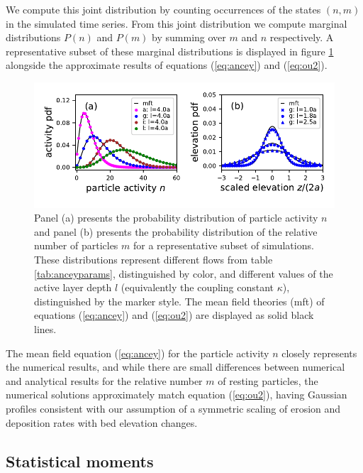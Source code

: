 \documentclass[draft]{agujournal2018}
\begin{document}
We compute this joint distribution by counting occurrences of the states $(n,m)$ in the simulated time series.
From this joint distribution we compute marginal distributions $P(n)$ and $P(m)$ by summing over $m$ and $n$ respectively.
A representative subset of these marginal distributions is displayed in figure \ref{fig:pdfs} alongside the approximate results of equations (\ref{eq:ancey}) and (\ref{eq:ou2}).
\begin{figure}[t]
	\includegraphics[width=\linewidth,keepaspectratio]{distributions.pdf}
	\caption{Panel (a) presents the probability distribution of particle activity $n$ and panel (b) presents the probability distribution of the relative number of particles $m$ for a representative subset of simulations. These distributions represent different flows from table \ref{tab:anceyparams}, distinguished by color, and different values of the active layer depth $l$ (equivalently the coupling constant $\kappa$), distinguished by the marker style. The mean field theories (mft) of equations (\ref{eq:ancey}) and (\ref{eq:ou2}) are displayed as solid black lines.}
	\label{fig:pdfs}
\end{figure}
The mean field equation (\ref{eq:ancey}) for the particle activity $n$ closely represents the numerical results, and while there are small differences between numerical and analytical results for the relative number $m$ of resting particles, the numerical solutions approximately match equation (\ref{eq:ou2}), having Gaussian profiles consistent with our assumption of a symmetric scaling of erosion and deposition rates with bed elevation changes. 


\subsection{Statistical moments}
\label{sec:mom}
\end{document}
